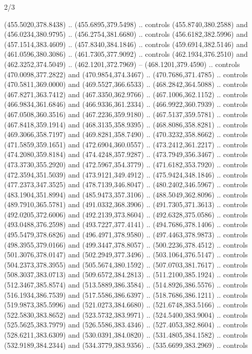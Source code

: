 \begin{flagdescription}{2/3}
\begin{scope}[xshift=0.5\flaglength,yshift=0.5\flagwidth,scale=\flagwidth/562]
\begin{scope}[y=1pt, x=1pt, yscale=-1,shift={(-421.88,-281.25)}]
  (455.5020,378.8438) .. (455.6895,379.5498) .. controls (455.8740,380.2588) and
  (456.0234,380.9795) .. (456.2754,381.6680) .. controls (456.6182,382.5996) and
  (457.1514,383.4609) .. (457.8340,384.1846) .. controls (459.6914,382.5146) and
  (461.0596,380.3086) .. (461.7305,377.9092) .. controls (462.1934,376.2510) and
  (462.3252,374.5049) .. (462.1201,372.7969) -- (468.1201,379.4590) .. controls
  (470.0098,377.2822) and (470.9854,374.3467) .. (470.7686,371.4785) .. controls
  (470.5811,369.0000) and (469.5527,366.6533) .. (468.2842,364.5088) .. controls
  (467.8271,363.7412) and (467.3350,362.9766) .. (467.1006,362.1152) .. controls
  (466.9834,361.6846) and (466.9336,361.2334) .. (466.9922,360.7939) .. controls
  (467.0508,360.3516) and (467.2236,359.9180) .. (467.5137,359.5781) .. controls
  (467.8418,359.1914) and (468.3135,358.9395) .. (468.8086,358.8281) .. controls
  (469.3066,358.7197) and (469.8281,358.7490) .. (470.3232,358.8662) .. controls
  (471.5859,359.1651) and (472.6904,360.0557) .. (473.2412,361.2217) .. controls
  (474.2080,359.8184) and (474.4248,357.9287) .. (473.7949,356.3467) .. controls
  (473.3730,355.2920) and (472.5967,354.3779) .. (471.6182,353.7920) .. controls
  (472.3594,351.5039) and (473.9121,349.4912) .. (475.9424,348.1846) .. controls
  (477.2373,347.3525) and (478.7139,346.8047) .. (480.2402,346.5967) .. controls
  (483.1904,351.8994) and (485.9473,357.3106) .. (488.5049,362.8096) .. controls
  (489.7910,365.5781) and (491.0332,368.3906) .. (491.7305,371.3613) .. controls
  (492.0205,372.6006) and (492.2139,373.8604) .. (492.6328,375.0586) .. controls
  (493.0488,376.2598) and (493.7227,377.4141) .. (494.7686,378.1406) .. controls
  (495.5479,378.6826) and (496.4971,378.9580) .. (497.4463,378.9873) .. controls
  (498.3955,379.0166) and (499.3447,378.8057) .. (500.2236,378.4512) .. controls
  (501.3076,378.0147) and (502.2949,377.3496) .. (503.1064,376.5147) .. controls
  (504.2373,378.3955) and (505.5674,380.1592) .. (507.0703,381.7617) .. controls
  (508.3037,383.0713) and (509.6572,384.2813) .. (511.2100,385.1924) .. controls
  (512.3467,385.8574) and (513.5889,386.3584) .. (514.8926,386.5576) .. controls
  (516.1934,386.7539) and (517.5586,386.6397) .. (518.7686,386.1211) .. controls
  (519.9873,385.5996) and (521.0273,384.6680) .. (521.6748,383.5166) .. controls
  (522.5830,383.8652) and (523.5732,383.9971) .. (524.5400,383.9004) .. controls
  (525.5625,383.7979) and (526.5586,383.4346) .. (527.4053,382.8604) .. controls
  (528.6211,383.6309) and (530.0391,384.0820) .. (531.4805,384.1582) .. controls
  (532.9189,384.2344) and (534.3779,383.9356) .. (535.6699,383.2969) .. controls

\end{scope}
\end{scope}
\end{flagdescription}
